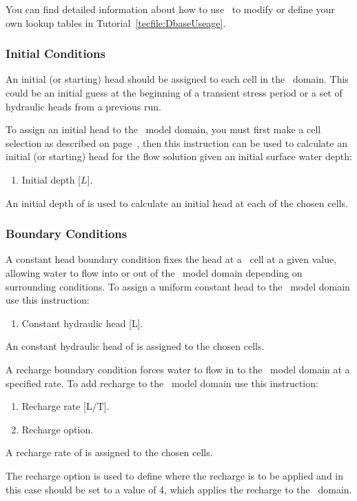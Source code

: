 You can find detailed information about how to use \dbase\ to modify or define your own lookup tables in Tutorial~\ref{tecfile:DbaseUseage}.

\subsubsection{Initial Conditions}  
An initial (or starting) head should be assigned to each cell in the \swf\ domain.  This could be an initial guess at the beginning of a transient stress period or a set of hydraulic heads from a previous run.

To assign an initial head to the \swf\ model domain, you must first make a cell selection as described on page~\pageref{page:cellSelect}, then this instruction can be used to calculate an initial (or starting) head for the flow solution given an initial surface water depth:

    {
        \squish
        \begin{enumerate}
        \item {}  Initial depth [$L$].
        \end{enumerate}
          An initial depth of  is used to calculate an initial head at each of the chosen cells.
    }

\subsubsection{Boundary Conditions}  
A constant head boundary condition fixes the head at a \swf\ cell at a given value, allowing water to flow into or out of the \swf\ model domain depending on surrounding conditions.    To assign a uniform constant head to the \swf\ model domain use this instruction:

    {
        \squish
        \begin{enumerate}
        \item {}  Constant hydraulic head [L].
        \end{enumerate}
          An constant hydraulic head  of  is assigned to the chosen cells.
    }

A recharge boundary condition forces  water to flow in to the \swf\ model domain at a specified rate.   To add recharge  to the \swf\ model domain use this instruction:

    {
        \squish
        \begin{enumerate}
            \item {}  Recharge rate [L/T].
            \item {}  Recharge option.
        \end{enumerate}
        A recharge rate of  is assigned to the chosen cells.

        The recharge option  is used to define where the recharge is to be applied and in this case should be set to a value of 4, which applies the recharge to the \swf\ domain.
    }

